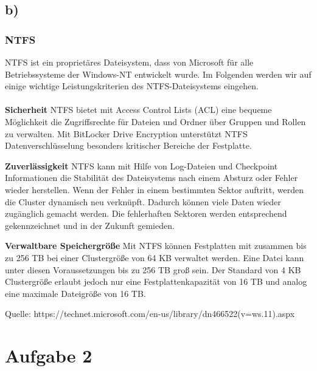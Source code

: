 \documentclass[numbers=noendperiod]{scrartcl}
\begin{document}
\subsection*{b)}
\subsubsection*{NTFS}
NTFS ist ein proprietäres Dateisystem, dass von Microsoft für alle Betriebssysteme der Windows-NT entwickelt wurde. Im Folgenden werden wir auf einige wichtige Leistungskriterien des NTFS-Dateisystems eingehen.\\ \\

\textbf{Sicherheit}
NTFS bietet mit Access Control Lists (ACL) eine bequeme Möglichkeit die Zugriffsrechte für Dateien und Ordner über Gruppen und Rollen zu verwalten. Mit BitLocker Drive Encryption unterstützt NTFS Datenverschlüsselung besonders kritischer Bereiche der Festplatte. 

\textbf{Zuverlässigkeit}
NTFS kann mit Hilfe von Log-Dateien und Checkpoint Informationen die Stabilität des Dateisystems nach einem Absturz oder Fehler wieder herstellen. Wenn der Fehler in einem bestimmten Sektor auftritt, werden die Cluster dynamisch neu verknüpft. Dadurch können viele Daten wieder zugänglich gemacht werden. Die fehlerhaften Sektoren werden entsprechend gekennzeichnet und in der Zukunft gemieden. 

\textbf{Verwaltbare Speichergröße}
Mit NTFS können Festplatten mit zusammen bis zu 256 TB bei einer Clustergröße von 64 KB verwaltet werden. Eine Datei kann unter diesen Voraussetzungen bis zu 256 TB groß sein. Der Standard von 4 KB Clustergröße erlaubt jedoch nur eine Festplattenkapazität von 16 TB und analog eine maximale Dateigröße von 16 TB. 

Quelle:
https://technet.microsoft.com/en-us/library/dn466522(v=ws.11).aspx
\section*{Aufgabe 2}


\end{document}
